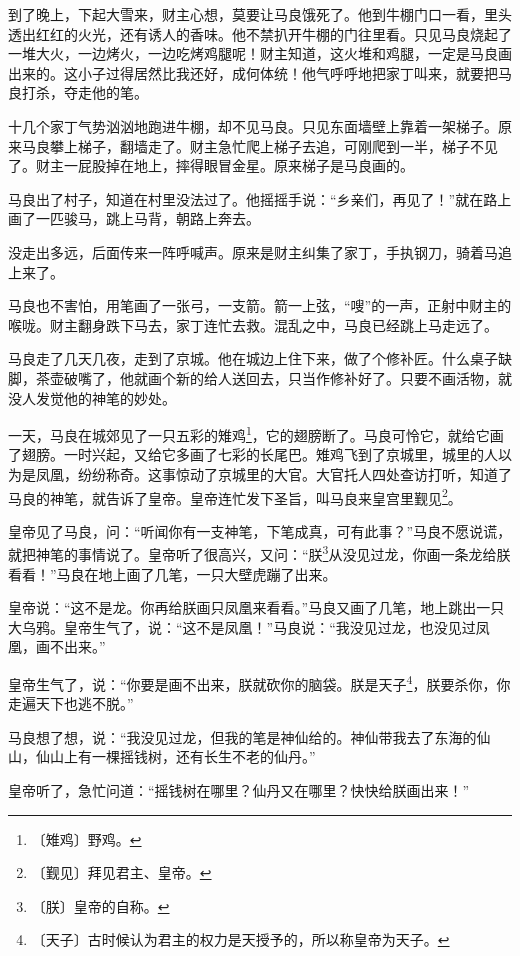 \documentclass[12pt,UTF-8,openany]{ctexbook}
\begin{document}
\begin{large}
    到了晚上，下起大雪来，财主心想，莫要让马良饿死了。他到牛棚门口一看，里头透出红红的火光，还有诱人的香味。他不禁扒开牛棚的门往里看。只见马良烧起了一堆大火，一边烤火，一边吃烤鸡腿呢！财主知道，这火堆和鸡腿，一定是马良画出来的。这小子过得居然比我还好，成何体统！他气呼呼地把家丁叫来，就要把马良打杀，夺走他的笔。
    
    十几个家丁气势汹汹地跑进牛棚，却不见马良。只见东面墙壁上靠着一架梯子。原来马良攀上梯子，翻墙走了。财主急忙爬上梯子去追，可刚爬到一半，梯子不见了。财主一屁股掉在地上，摔得眼冒金星。原来梯子是马良画的。
    
    马良出了村子，知道在村里没法过了。他摇摇手说：“乡亲们，再见了！”就在路上画了一匹骏马，跳上马背，朝路上奔去。
    
    没走出多远，后面传来一阵呼喊声。原来是财主纠集了家丁，手执钢刀，骑着马追上来了。
    
    马良也不害怕，用笔画了一张弓，一支箭。箭一上弦，“嗖”的一声，正射中财主的喉咙。财主翻身跌下马去，家丁连忙去救。混乱之中，马良已经跳上马走远了。
    
    马良走了几天几夜，走到了京城。他在城边上住下来，做了个修补匠。什么桌子缺脚，茶壶破嘴了，他就画个新的给人送回去，只当作修补好了。只要不画活物，就没人发觉他的神笔的妙处。
    
    一天，马良在城郊见了一只五彩的雉鸡\footnote{〔雉鸡〕野鸡。}，它的翅膀断了。马良可怜它，就给它画了翅膀。一时兴起，又给它多画了七彩的长尾巴。雉鸡飞到了京城里，城里的人以为是凤凰，纷纷称奇。这事惊动了京城里的大官。大官托人四处查访打听，知道了马良的神笔，就告诉了皇帝。皇帝连忙发下圣旨，叫马良来皇宫里觐见\footnote{〔觐见〕拜见君主、皇帝。}。
    
    皇帝见了马良，问：“听闻你有一支神笔，下笔成真，可有此事？”马良不愿说谎，就把神笔的事情说了。皇帝听了很高兴，又问：“朕\footnote{〔朕〕皇帝的自称。}从没见过龙，你画一条龙给朕看看！”马良在地上画了几笔，一只大壁虎蹦了出来。
    
    皇帝说：“这不是龙。你再给朕画只凤凰来看看。”马良又画了几笔，地上跳出一只大乌鸦。皇帝生气了，说：“这不是凤凰！”马良说：“我没见过龙，也没见过凤凰，画不出来。”
    
    皇帝生气了，说：“你要是画不出来，朕就砍你的脑袋。朕是天子\footnote{〔天子〕古时候认为君主的权力是天授予的，所以称皇帝为天子。}，朕要杀你，你走遍天下也逃不脱。”
    
    马良想了想，说：“我没见过龙，但我的笔是神仙给的。神仙带我去了东海的仙山，仙山上有一棵摇钱树，还有长生不老的仙丹。”
    
    皇帝听了，急忙问道：“摇钱树在哪里？仙丹又在哪里？快快给朕画出来！”
    

\end{large}
\end{document}
